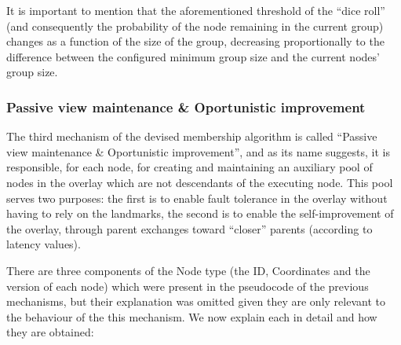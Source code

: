  It is important to mention that the aforementioned threshold of the ``dice roll'' (and consequently the probability of the node remaining in the current group) changes as a function of the size of the group, decreasing proportionally to the difference between the configured minimum group size and the current nodes' group size.

\subsubsection{Passive view maintenance \& Oportunistic improvement} \label{sec:overlay_network:oportunistic_improvement}

The third mechanism of the devised membership algorithm is called ``Passive view maintenance \& Oportunistic improvement'', and as its  name suggests, it is responsible, for each node, for creating and maintaining an auxiliary pool of nodes in the overlay which are not descendants of the executing node. This pool serves two purposes: the first is to enable fault tolerance in the overlay without having to rely on the landmarks, the second is to enable the self-improvement of the overlay, through parent exchanges toward ``closer'' parents (according to latency values). 

There are three components of the Node type (the ID, Coordinates and the version of each node) which were present in the pseudocode of the previous mechanisms, but their explanation was omitted given they are only relevant to the behaviour of the this mechanism. We now explain each in detail and how they are obtained:

